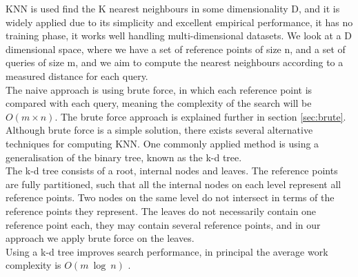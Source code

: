 KNN is used find the K nearest neighbours in some dimensionality D, and it is widely applied due to its simplicity and excellent empirical performance, it has no training phase, it works well handling multi-dimensional datasets. 
We look at a D dimensional space, where we have a set of reference points of size n, and a set of queries of size m, and we aim to compute the nearest neighbours according to a measured distance for each query. 
\\[2mm]
The naive approach is using brute force, in which each reference point is compared with each query, meaning the complexity of the search will be $O(m\times n)$. The brute force approach is explained further in section \ref{sec:brute}. Although brute force is a simple solution, there exists several alternative techniques for computing KNN. One commonly applied method is using a generalisation of the binary tree, known as the k-d tree. 
\\[2mm]
The k-d tree consists of a root, internal nodes and leaves. 
The reference points are fully partitioned, such that all the internal nodes on each level represent all reference points. Two nodes on the same level do not intersect in terms of the reference points they represent.
The leaves do not necessarily contain one reference point each, they may contain several reference points, and in our approach we apply brute force on the leaves.  
\\[2mm]
Using a k-d tree improves search performance, in principal the average work complexity is $O(m\ \log\ n)$ \cite{logmatches}. %
